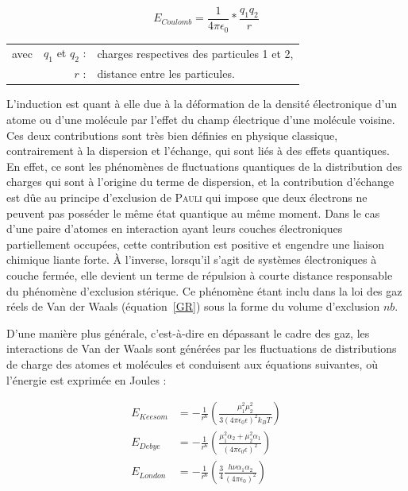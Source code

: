 \begin{equation}
E_{Coulomb} = \frac{1}{4 \pi \epsilon_{0}} * \frac{q_{1} q_{2}}{r}
\end{equation}

\begin{flushleft}
\begin{tabular}{@{}lrp{10cm}}
avec & $q_{1}$ et $q_{2}$ : & charges respectives des particules 1 et 2, \\
& $r$ : & distance entre les particules. 
\end{tabular}
\end{flushleft}

L'induction est quant à elle due à la déformation de la densité électronique d'un atome ou d'une molécule par l'effet du champ électrique d'une molécule voisine. Ces deux contributions sont très bien définies en physique classique, contrairement à la dispersion et l'échange, qui sont liés à des effets quantiques.
En effet, ce sont les phénomènes de fluctuations quantiques de la distribution des charges qui sont à l'origine du terme de dispersion, et la contribution d'échange est dûe au principe d'exclusion de \textsc{Pauli} qui impose que deux électrons ne peuvent pas posséder le même état quantique au même moment. Dans le cas d'une paire d'atomes en interaction ayant leurs couches électroniques partiellement occupées, cette contribution est positive et engendre une liaison chimique liante forte. À l'inverse, lorsqu'il s'agit de systèmes électroniques à couche fermée, elle devient un terme de répulsion à courte distance responsable du phénomène d'exclusion stérique. Ce phénomène étant inclu dans la loi des \og gaz réels \fg{} de Van der Waals (équation~\ref{GR}) sous la forme du volume d'exclusion $nb$.  


D'une manière plus générale, c'est-à-dire en dépassant le cadre des gaz, les interactions de Van der Waals sont générées par les fluctuations de distributions de charge des atomes et molécules et conduisent aux équations suivantes, où l'énergie est exprimée en Joules :

\begin{align}
E_{Keesom} &= - \frac{1}{r^{6}} \left(\frac{\mu_{1}^{2}\mu_{2}^{2}}{3(4\pi \epsilon_{0} \epsilon)^{2} k_{B}T}\right) \\
E_{Debye} &= - \frac{1}{r^{6}} \left(\frac{\mu_{1}^{2}\alpha_{2}+\mu_{2}^{2}\alpha_{1}}{(4\pi \epsilon_{0} \epsilon)^{2}}\right) \\
E_{London} &= - \frac{1}{r^{6}} \left(\frac{3}{4}\frac{h\nu\alpha_{1}\alpha_{2}}{(4\pi \epsilon_{0})^{2}}\right)
\end{align}

